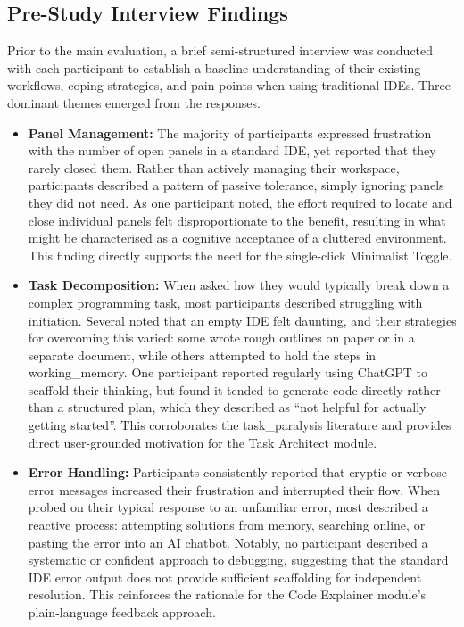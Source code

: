 \subsection{Pre-Study Interview Findings}
Prior to the main evaluation, a brief semi-structured interview was conducted with each participant to establish a baseline understanding of their existing 
workflows, coping strategies, and pain points when using traditional \glspl{IDE}. Three dominant themes emerged from the responses.
\begin{itemize}

\item \textbf{Panel Management:} The majority of participants expressed frustration with the number of open panels in a standard \gls{IDE}, yet reported 
that they rarely closed them. Rather than actively managing their workspace, participants described a pattern of passive tolerance, simply ignoring panels 
they did not need. As one participant noted, the effort required to locate and close individual panels felt disproportionate to the benefit, resulting in what 
might be characterised as a cognitive acceptance of a cluttered environment. This finding directly supports the need for the single-click Minimalist Toggle.


\item \textbf{Task Decomposition:} When asked how they would typically break down a complex programming task, most participants described struggling with initiation.
Several noted that an empty \gls{IDE} felt daunting, and their strategies for overcoming this varied: some wrote rough outlines on paper or 
in a separate document, while others attempted to hold the steps in \gls{working_memory}. One participant reported regularly using ChatGPT to scaffold 
their thinking, but found it tended to generate code directly rather than a structured plan, which they described as ``not helpful for actually getting 
started''. This corroborates the \gls{task_paralysis} literature and provides direct user-grounded motivation for the Task Architect module.

\item \textbf{Error Handling:} Participants consistently reported that cryptic or verbose error messages increased their frustration and interrupted their 
flow. When probed on their typical response to an unfamiliar error, most described a reactive process: attempting solutions from memory, searching 
online, or pasting the error into an \gls{AI} chatbot. Notably, no participant described a systematic or confident approach to debugging, suggesting that 
the standard \gls{IDE} error output does not provide sufficient \gls{scaffolding} for independent resolution. This reinforces the rationale for the Code Explainer 
module's plain-language feedback approach.

\end{itemize}

